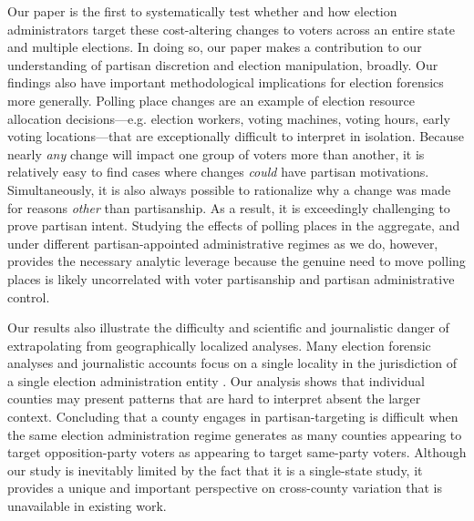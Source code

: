 \documentclass[12pt]{article}
\begin{document}
Our paper is the first to systematically test whether and how election administrators target these cost-altering changes to voters across an entire state and multiple elections.  In doing so, our paper makes a contribution to our understanding of partisan discretion and election manipulation, broadly.  Our findings also have important methodological implications for election forensics more generally. Polling place changes are an example of election resource allocation decisions---e.g. election workers, voting machines, voting hours, early voting locations---that are exceptionally difficult to interpret in isolation. Because nearly \emph{any} change will impact one group of voters more than another, it is relatively easy to find cases where changes \emph{could} have partisan motivations.  Simultaneously, it is also always possible to rationalize why a change was made for reasons \emph{other} than partisanship.  As a result, it is exceedingly challenging to prove partisan intent.  Studying the effects of polling places in the aggregate, and under different partisan-appointed administrative regimes as we do, however, provides the necessary analytic leverage because the genuine need to move polling places is likely uncorrelated with voter partisanship and partisan administrative control.


Our results also illustrate the difficulty and scientific and journalistic danger of extrapolating from geographically localized analyses. Many election forensic analyses and journalistic accounts focus on a single locality in the jurisdiction of a single election administration entity \citep{dyck2005distance, gimpel2003political, haspel2005location, cantoni2016, amos2017reprecincting}. Our analysis shows that individual counties may present patterns that are hard to interpret absent the larger context. Concluding that a county engages in partisan-targeting is difficult when the same election administration regime generates as many counties appearing to target opposition-party voters as appearing to target same-party voters.  Although our study is inevitably limited by the fact that it is a single-state study, it provides a unique and important perspective on cross-county variation that is unavailable in existing work.
\end{document}
